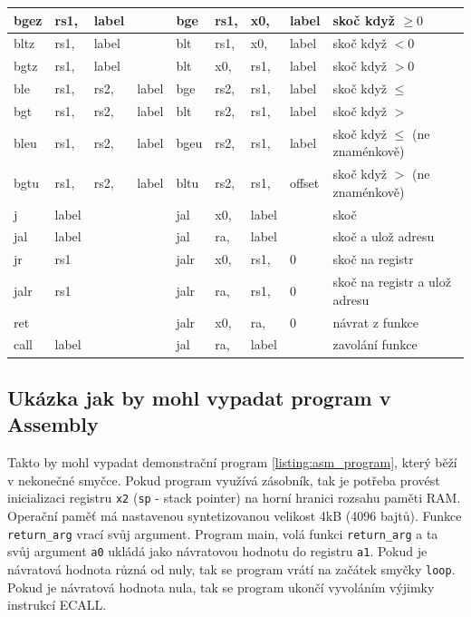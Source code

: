 \documentclass[FM,BP]{tulthesis}
\newcommand{\argument}[1]{{\ttfamily\color{\tulcolor}#1}}
\newcommand{\argumentindex}[1]{\argument{#1}\index{#1}}
\begin{document}
\begin{table}[h]
\begin{center}
{\begin{tabular}{|llll|llll|l|}
        \\
        \hline
        bgez &rs1, &label &&
        bge &rs1, &x0, &label & 
        skoč když $\ge 0$        
        \\
        \hline
        bltz &rs1, &label &&
        blt &rs1, &x0,& label & 
        skoč když $< 0$
        \\
        \hline
        bgtz &rs1, &label &&  
        blt &x0, &rs1, &label & 
        skoč když $> 0$
        \\
        \hline
        ble &rs1, &rs2, &label &  
        bge &rs2, &rs1, &label & 
        skoč když $\le$
        \\
        \hline
        bgt &rs1, &rs2, &label &  
        blt &rs2, &rs1, &label & 
        skoč když $>$
        \\
        \hline
        bleu &rs1, &rs2, &label &  
        bgeu &rs2, &rs1, &label & 
        skoč když $\le$ (ne znaménkově)
        \\
        \hline
        bgtu &rs1, &rs2, &label &  
        bltu &rs2, &rs1, &offset & 
        skoč když $>$ (ne znaménkově)
        \\
        \hline
        j & label &&&  
        jal &x0, &label & &
        skoč        
        \\
        \hline
        jal &label &&&  
        jal &ra, &label & &
        skoč a ulož adresu
        \\
        \hline
        jr &rs1 &&&
        jalr &x0, &rs1, &0 & 
        skoč na registr
        \\
        \hline
        jalr &rs1 &&&  
        jalr &ra, &rs1,& 0 & 
        skoč na registr a ulož adresu
        \\
        \hline
        ret & &&&
        jalr &x0, &ra,& 0 & 
        návrat z funkce
        \\
        \hline
        call &label &&&  
        jal &ra, &label && 
        zavolání funkce
        \\
        \hline
        \end{tabular}
    }
    \end{center}
\end{table}


\newpage
\subsection{Ukázka jak by mohl vypadat program v Assembly}
Takto by mohl vypadat demonstrační program \ref{listing:asm_program}, který běží v nekonečné smyčce. 
Pokud program využívá zásobník, tak je potřeba provést inicializaci registru \verb|x2| (\verb|sp| - stack pointer) na horní hranici rozsahu paměti RAM. Operační paměť má nastavenou syntetizovanou velikost 4kB (4096 bajtů).
Funkce \verb|return_arg| vrací svůj argument. Program main, volá funkci \verb|return_arg| a ta svůj argument \verb|a0| ukládá jako návratovou hodnotu do registru \verb|a1|. Pokud je návratová hodnota různá od nuly, tak se program vrátí na začátek smyčky \verb|loop|. Pokud je návratová hodnota nula, tak se program ukončí vyvoláním výjimky instrukcí \argumentindex{ECALL}.
\end{document}
